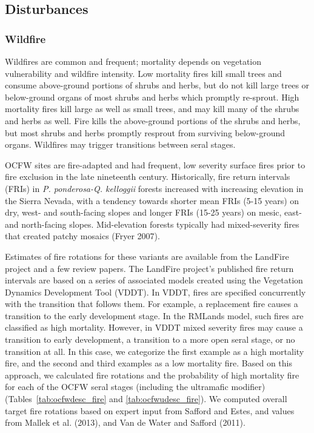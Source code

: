 \subsection*{Disturbances}

\subsubsection{Wildfire}
Wildfires are common and frequent; mortality depends on vegetation vulnerability and wildfire intensity. Low mortality fires kill small trees and consume above-ground portions of shrubs and herbs, but do not kill large trees or below-ground organs of most shrubs and herbs which promptly re-sprout. High mortality fires kill large as well as small trees, and may kill many of the shrubs and herbs as well. Fire kills the above-ground portions of the shrubs and herbs, but most shrubs and herbs promptly resprout from surviving below-ground organs. Wildfires may trigger transitions between seral stages.

OCFW sites are fire-adapted and had frequent, low severity surface fires prior to fire exclusion in the late nineteenth century. Historically, fire return intervals (FRIs) in \emph{P. ponderosa-Q. kelloggii} forests increased with increasing elevation in the Sierra Nevada, with a tendency towards shorter mean FRIs (5-15 years) on dry, west- and south-facing slopes and longer FRIs (15-25 years) on mesic, east- and north-facing slopes. Mid-elevation forests typically had mixed-severity fires that created patchy mosaics (Fryer 2007).

Estimates of fire rotations for these variants are available from the LandFire project and a few review papers. The LandFire project’s published fire return intervals are based on a series of associated models created using the Vegetation Dynamics Development Tool (VDDT). In VDDT, fires are specified concurrently with the transition that follows them. For example, a replacement fire causes a transition to the early development stage. In the RMLands model, such fires are classified as high mortality. However, in VDDT mixed severity fires may cause a transition to early development, a transition to a more open seral stage, or no transition at all. In this case, we categorize the first example as a high mortality fire, and the second and third examples as a low mortality fire. Based on this approach, we calculated fire rotations and the probability of high mortality fire for each of the OCFW seral stages (including the ultramafic modifier) (Tables~\ref{tab:ocfwdesc_fire} and \ref{tab:ocfwudesc_fire}). We computed overall target fire rotations based on expert input from Safford and Estes, and values from Mallek et al. (2013), and Van de Water and Safford (2011). 




